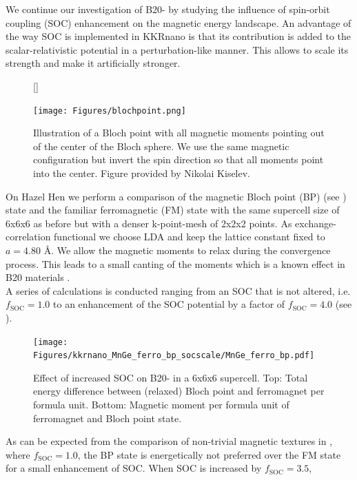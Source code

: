 \documentclass [a4paper, 12pt]{article}
\begin{document}
We continue our investigation of B20- by studying the influence of spin-orbit
coupling (SOC) enhancement on the magnetic energy landscape.
An advantage of the way SOC is implemented in KKRnano is that
its contribution is added to the scalar-relativistic
potential in a perturbation-like manner. This allows to scale its strength and make it
artificially stronger. \\
\begin{figure}
	[\FBwidth]
{\caption{Illustration of a Bloch point with all magnetic moments pointing out of the center of the Bloch sphere.
	We use the same magnetic configuration but invert the spin direction so that all moments point
	into the center. Figure provided by Nikolai Kiselev.}\label{fig:blochpoint}}
{\texttt{[image: Figures/blochpoint.png]}}
\end{figure}
On Hazel Hen we perform a comparison of the magnetic Bloch point (BP) (see ) 
state and the familiar ferromagnetic (FM) state
with the same supercell size of 6x6x6 as before but with a denser k-point-mesh of 2x2x2 points.
As exchange-correlation functional we choose LDA and keep the lattice constant fixed to $a=4.80$ \AA.
We allow the magnetic moments to relax during the convergence process.
This leads to a small canting of the moments which is a known effect in
B20 materials \cite{chizhikov_multishell_2013}.
\\
A series of calculations is conducted ranging from an SOC that is not altered, i.e. $f_{\text{SOC}}=1.0$ to
an enhancement of the SOC potential by a
factor of $f_{\text{SOC}}=4.0$ (see ).
\begin{figure}[h]
\begin{center}
 \texttt{[image: Figures/kkrnano\_MnGe\_ferro\_bp\_socscale/MnGe\_ferro\_bp.pdf]}
\end{center}
\caption{Effect of increased SOC on B20- in a 6x6x6 supercell.
	Top: Total energy difference between (relaxed) Bloch point and ferromagnet per formula unit.
	Bottom: Magnetic moment per formula unit of ferromagnet and Bloch point state.
	}
\label{fig:MnGe_ferro_bp_socscale}
\end{figure}
As can be expected from the comparison of non-trivial magnetic textures 
in , where $f_{\text{SOC}}=1.0$, 
the BP state is energetically not preferred over the FM state for a small
enhancement of SOC.
When SOC is increased by $f_{\text{SOC}}=3.5$,
\end{document}
